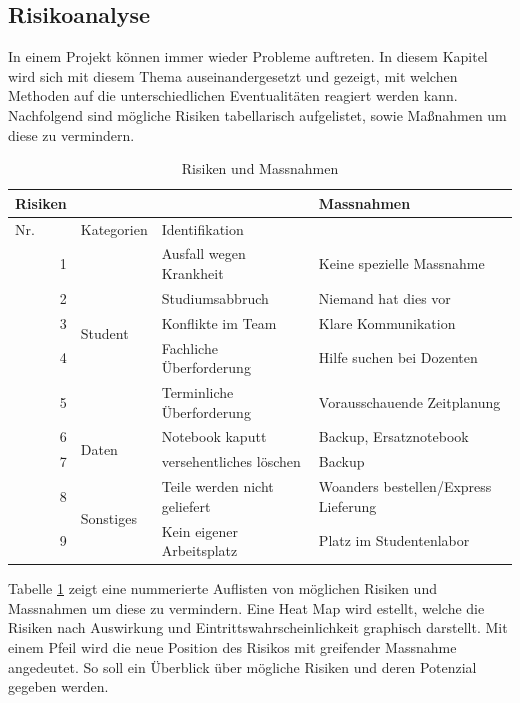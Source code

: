 \subsection{Risikoanalyse}
In einem Projekt können immer wieder Probleme auftreten. In diesem Kapitel wird sich mit diesem Thema auseinandergesetzt und gezeigt, mit welchen Methoden auf die unterschiedlichen Eventualitäten reagiert werden kann.
Nachfolgend sind mögliche Risiken tabellarisch aufgelistet, sowie Maßnahmen um diese zu vermindern.\\
\begin{table}[htbp]
  \centering
  \caption{Risiken und Massnahmen}
    \begin{tabular}{|r|l|l|l|}
    \toprule
    \multicolumn{1}{|l}{\textbf{Risiken}} & \multicolumn{1}{r}{} &       & \textbf{Massnahmen} \\
    \hline
    \multicolumn{1}{|l|}{Nr.} & \multicolumn{1}{l|}{Kategorien} & Identifikation &  \\
    \hline
    1     & \multirow{5}{*}{Student} & Ausfall wegen Krankheit & Keine spezielle Massnahme \\
\cline{1-1}\cline{3-4}    2     &       & Studiumsabbruch & Niemand hat dies vor \\
\cline{1-1}\cline{3-4}    3     &       & Konflikte im Team & Klare Kommunikation \\
\cline{1-1}\cline{3-4}    4     &       & Fachliche Überforderung & Hilfe suchen bei Dozenten \\
\cline{1-1}\cline{3-4}    5     &       & Terminliche Überforderung & Vorausschauende Zeitplanung \\
    \hline
    6     & \multirow{2}{*}{Daten} & Notebook kaputt & Backup, Ersatznotebook \\
\cline{1-1}\cline{3-4}    7     &       & versehentliches löschen & Backup \\
    \hline
    8     & \multirow{2}{*}{Sonstiges} & Teile werden nicht geliefert & Woanders bestellen/Express Lieferung\\
\cline{1-1}\cline{3-4}    9     &       & Kein eigener Arbeitsplatz & Platz im Studentenlabor \\
    \bottomrule
    \end{tabular}%
  \label{tab:RisikenUndMassnahmen}%
\end{table}%

Tabelle \ref{tab:RisikenUndMassnahmen} zeigt eine nummerierte Auflisten von möglichen Risiken und Massnahmen um diese zu vermindern. Eine Heat Map wird estellt, welche die Risiken nach Auswirkung und Eintrittswahrscheinlichkeit graphisch darstellt. Mit einem Pfeil wird die neue Position des Risikos mit greifender Massnahme angedeutet. So soll ein Überblick über mögliche Risiken und deren Potenzial gegeben werden.\\

